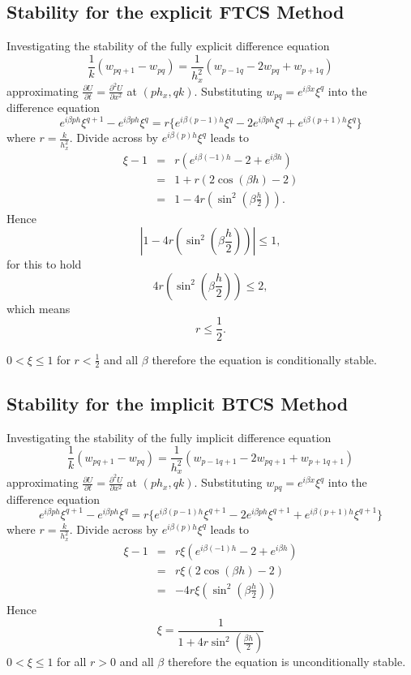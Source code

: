 \subsection{Stability for the explicit FTCS Method}
Investigating the stability of the fully explicit difference equation
\[\frac{1}{k}(w_{pq+1}-w_{pq})=\frac{1}{h_x^2}(w_{p-1q}-2w_{pq}+w_{p+1q})\]
approximating $\frac{\partial U}{\partial t}=\frac{\partial^2 U}{\partial x^2}$ at $(ph_x,qk)$. Substituting $w_{pq}=e^{i\beta x}\xi^{q}$ into the difference equation
\[e^{i\beta ph}\xi^{q+1}-e^{i\beta ph}\xi^{q}=
r\{
e^{i\beta (p-1)h}\xi^{q}
-2e^{i\beta ph}\xi^{q}
+
e^{i\beta (p+1)h}\xi^{q}
 \}
\]
where $r=\frac{k}{h_x^2}$. Divide across by $e^{i\beta (p)h}\xi^{q}$ leads to
\begin{eqnarray*} \xi-1&=&r(e^{i\beta (-1)h}
-2
+
e^{i\beta h})\\
&=& 1+r (2\cos(\beta h)-2)\\
&=&1-4r(\sin^2(\beta\frac{h}{2})).
\end{eqnarray*}
Hence \[\left| 1-4r(\sin^2(\beta\frac{h}{2}) )\right|\leq 1,\]
for this to hold 
\[ 4r(\sin^2(\beta\frac{h}{2}) )\leq 2, \]
which means 
\[ r\leq \frac{1}{2}. \] 

$0 < \xi \leq 1$ for  $r<\frac{1}{2}$ and all $\beta$ therefore the equation is conditionally stable.


\subsection{Stability for the implicit BTCS Method}
Investigating the stability of the fully implicit difference equation
\[\frac{1}{k}(w_{pq+1}-w_{pq})=\frac{1}{h_x^2}(w_{p-1q+1}-2w_{pq+1}+w_{p+1q+1})\]
approximating $\frac{\partial U}{\partial t}=\frac{\partial^2 U}{\partial x^2}$ at $(ph_x,qk)$. Substituting $w_{pq}=e^{i\beta x}\xi^{q}$ into the difference equation
\[e^{i\beta ph}\xi^{q+1}-e^{i\beta ph}\xi^{q}=
r\{
e^{i\beta (p-1)h}\xi^{q+1}
-2e^{i\beta ph}\xi^{q+1}
+
e^{i\beta (p+1)h}\xi^{q+1}
 \}
\]
where $r=\frac{k}{h_x^2}$. Divide across by $e^{i\beta (p)h}\xi^{q}$ leads to
\begin{eqnarray*} \xi-1&=&r\xi(e^{i\beta (-1)h}
-2
+
e^{i\beta h})\\
&=& r \xi(2\cos(\beta h)-2)\\
&=&-4r\xi(\sin^2(\beta\frac{h}{2}))
\end{eqnarray*}
Hence \[\xi = \frac{1}{1+4r\sin^2(\frac{\beta h}{2})}\]
$0 < \xi \leq 1$ for all $r>0$ and all $\beta$ therefore the equation is unconditionally stable.


